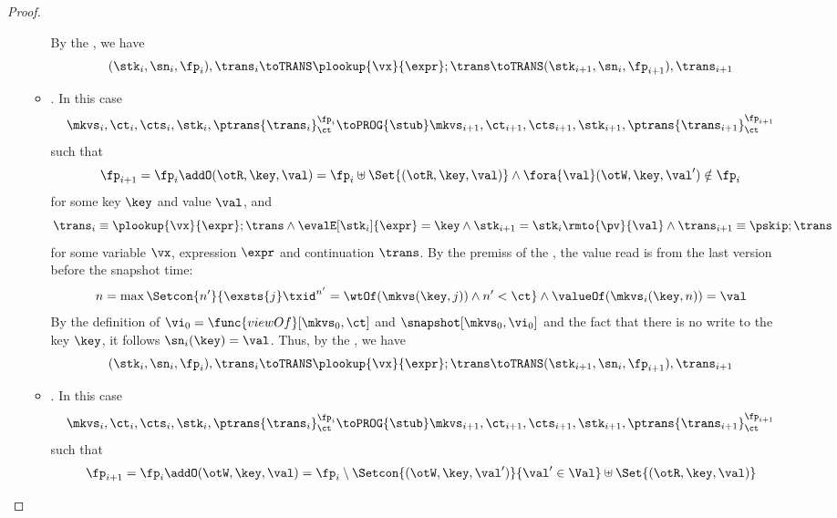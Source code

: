 \begin{proof}
\begin{itemize}
\begin{itemize}
                By the , we have 
                \[
                    (\stk_i, \sn_i, \fp_i), \trans_i \toTRANS \plookup{\vx}{\expr} ; \trans 
                    \toTRANS (\stk_{i+1}, \sn_i, \fp_{i+1} ), \trans_{i+1}
                \]
            \item {}.
                In this case
                \[
                    \mkvs_i, \ct_i, \cts_i, \stk_i, \ptrans{\trans_i}_\ct^{\fp_i}
                    \toPROG{\stub}
                    \mkvs_{i+1}, \ct_{i+1}, \cts_{i+1}, \stk_{i+1}, \ptrans{\trans_{i+1}}_\ct^{\fp_{i+1}}
                \]
                such that
                \[
                    \fp_{i+1} = \fp_i \addO (\otR, \key, \val) = \fp_i \uplus \Set{(\otR, \key, \val)}
                    \land \fora{\val} (\otW,\key, \val') \notin \fp_i
                \]
                for some key \( \key \) and value \( \val \), and
                \[
                    \trans_{i} \equiv \plookup{\vx}{\expr} ; \trans 
                    \land \evalE[\stk_i]{\expr} = \key 
                    \land \stk_{i+1} = \stk_i\rmto{\pv}{\val}
                    \land  \trans_{i+1} \equiv \pskip ; \trans
                \]
                for some variable \( \vx \), expression \( \expr \) and continuation \( \trans \).
                By the premiss of the , the value read is from the last version before the snapshot time:
                \[
                    n = \max\Setcon{n'}{%
                        \exsts{j} \txid^{n'} = \wtOf(\mkvs(\key, j)) \land n' < \ct%
                    } 
                    \land \valueOf(\mkvs_i(\key,n) ) = \val
                \]                 
                By the definition of \( \vi_0 = \func{viewOf}[\mkvs_0,\ct] \) and \( \snapshot[\mkvs_0,\vi_0] \) and the fact that there is no write to the key \( \key \),
                it follows \( \sn_i(\key) = \val \).
                Thus, by the , we have 
                \[
                    (\stk_i, \sn_i, \fp_i), \trans_i \toTRANS \plookup{\vx}{\expr} ; \trans 
                    \toTRANS (\stk_{i+1}, \sn_i, \fp_{i+1} ), \trans_{i+1}
                \]
            \item {}.
                In this case
                \[
                    \mkvs_i, \ct_i, \cts_i, \stk_i, \ptrans{\trans_i}_\ct^{\fp_i}
                    \toPROG{\stub}
                    \mkvs_{i+1}, \ct_{i+1}, \cts_{i+1}, \stk_{i+1}, \ptrans{\trans_{i+1}}_\ct^{\fp_{i+1}}
                \]
                such that
                \[
                    \fp_{i+1} = \fp_i \addO (\otW, \key, \val) = \fp_i \setminus \Setcon{(\otW, \key, \val')}{\val' \in \Val} \uplus \Set{(\otR, \key, \val)}
\]
\end{itemize}
\end{itemize}
\end{proof}

